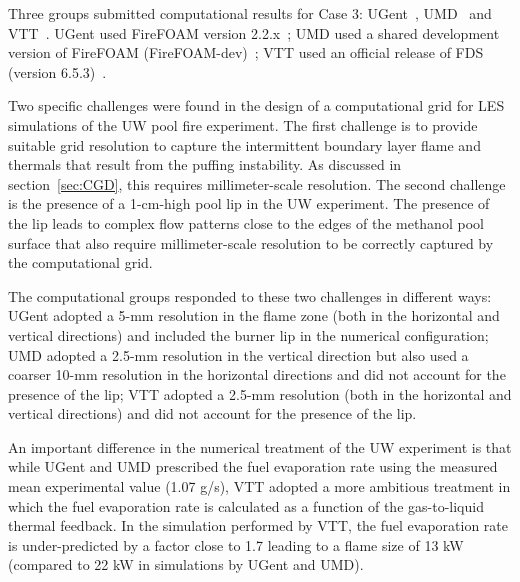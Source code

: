Three groups submitted computational results for Case 3: UGent~\cite{Case3_SIM_UGent}, UMD~\cite{Case3_SIM_UMD} and VTT~\cite{Case3_SIM_VTT}. UGent used FireFOAM version 2.2.x~\cite{FireFOAM}; UMD used a shared development version of FireFOAM (FireFOAM-dev)~\cite{FireFOAM}; VTT used an official release of FDS (version 6.5.3)~\cite{FDS}.

Two specific challenges were found in the design of a computational grid for LES simulations of the UW pool fire experiment. The first challenge is to provide suitable grid resolution to capture the intermittent boundary layer flame and thermals that result from the puffing instability. As discussed in section~\ref{sec:CGD}, this requires millimeter-scale resolution. The second challenge is the presence of a 1-cm-high pool lip in the UW experiment. The presence of the lip leads to complex flow patterns close to the edges of the methanol pool surface that also require millimeter-scale resolution to be correctly captured by the computational grid.

The computational groups responded to these two challenges in different ways: UGent adopted a 5-mm resolution in the flame zone (both in the horizontal and vertical directions) and included the burner lip in the numerical configuration; UMD adopted a 2.5-mm resolution in the vertical direction but also used a coarser 10-mm resolution in the horizontal directions and did not account for the presence of the lip; VTT adopted a 2.5-mm resolution (both in the horizontal and vertical directions) and did not account for the presence of the lip.

An important difference in the numerical treatment of the UW experiment is that while UGent and UMD prescribed the fuel evaporation rate using the measured mean experimental value (1.07 g/s), VTT adopted a more ambitious treatment in which the fuel evaporation rate is calculated as a function of the gas-to-liquid thermal feedback. In the simulation performed by VTT, the fuel evaporation rate is under-predicted by a factor close to 1.7 leading to a flame size of 13 kW (compared to 22 kW in simulations by UGent and UMD).

